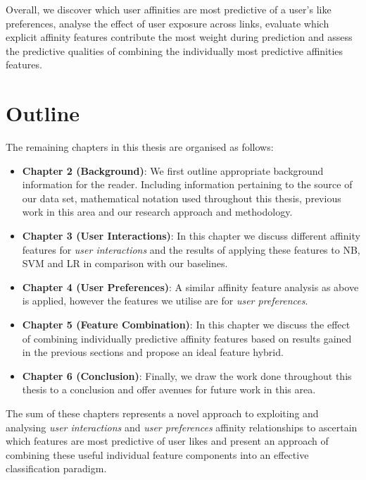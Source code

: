 Overall, we discover which user affinities are most predictive of a user's like preferences, analyse the effect of user exposure across links, 
evaluate which explicit affinity features contribute the most weight during prediction and assess the predictive qualities of combining 
the individually most predictive affinities features.

\section{Outline}
\label{sec:outline}

The remaining chapters in this thesis are organised as follows:
\begin{itemize}
\item \textbf{Chapter 2 (Background)}: We first outline appropriate background information for the reader. Including information pertaining to the source of 
our data set, mathematical notation used throughout this thesis, previous work in this area and our research approach and methodology.
\item \textbf{Chapter 3 (User Interactions)}: In this chapter we discuss different affinity features for \emph{user interactions} and the results of applying these features to NB, SVM and LR 
in comparison with our baselines.
\item \textbf{Chapter 4 (User Preferences)}: A similar affinity feature analysis as above is applied, however the features we utilise are for \emph{user preferences}.
\item \textbf{Chapter 5 (Feature Combination)}: In this chapter we discuss the effect of combining individually predictive affinity features based on results gained in the previous sections
and propose an ideal feature hybrid.
\item \textbf{Chapter 6 (Conclusion)}: Finally, we draw the work done throughout this thesis to a conclusion and offer avenues for future work in this area.
\end{itemize}

The sum of these chapters represents a novel approach to exploiting and analysing \emph{user interactions} and \emph{user preferences} affinity relationships
to ascertain which features are most predictive of user likes and present an approach of combining these useful individual feature components into an effective 
classification paradigm.

